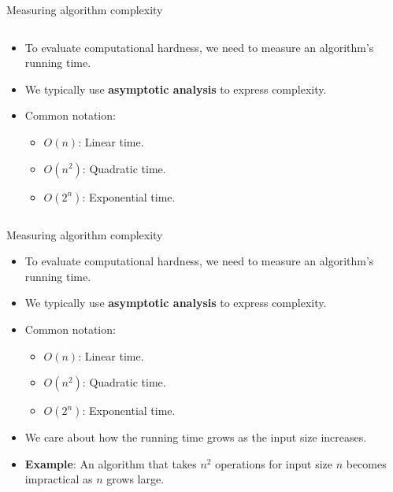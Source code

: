 \documentclass[aspectratio=169, lualatex, handout]{beamer}
\begin{document}
\begin{frame}{Measuring algorithm complexity}
	\begin{columns}[c]
		\begin{column}{0.4\textwidth}
			\begin{itemize}[<+->]
				\item To evaluate computational hardness, we need to measure an algorithm's running time.
				\item We typically use \textbf{asymptotic analysis} to express complexity.
				\item Common notation:
				      \begin{itemize}
					      \item $O(n)$: Linear time.
					      \item $O(n^2)$: Quadratic time.
					      \item $O(2^n)$: Exponential time.
				      \end{itemize}
			\end{itemize}
		\end{column}
		\begin{column}{0.6\textwidth}
		\end{column}
	\end{columns}
\end{frame}

\begin{frame}{Measuring algorithm complexity}
	\begin{itemize}
		\item To evaluate computational hardness, we need to measure an algorithm's running time.
		\item We typically use \textbf{asymptotic analysis} to express complexity.
		\item Common notation:
		      \begin{itemize}
			      \item $O(n)$: Linear time.
			      \item $O(n^2)$: Quadratic time.
			      \item $O(2^n)$: Exponential time.
		      \end{itemize}
		\item We care about how the running time grows as the input size increases.
		\item \textbf{Example}: An algorithm that takes $n^2$ operations for input size $n$ becomes impractical as $n$ grows large.
	\end{itemize}
\end{frame}
\end{document}
